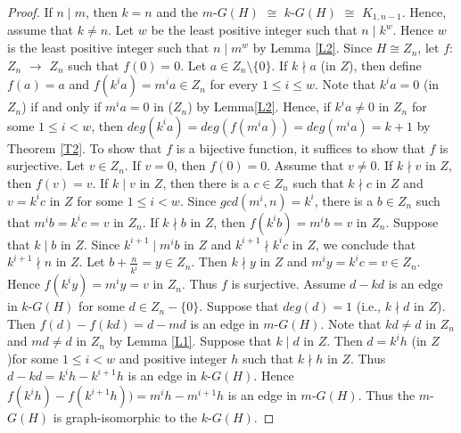 \documentclass{amsart}
\theoremstyle{plain}
\begin{document}
\begin{proof}
If $n \mid m$, then $k = n$ and the $m$-$G(H)$ $\cong$ $k$-$G(H)$ $\cong$ $K_{1, n-1}$.  Hence, assume that $k \not = n$. Let $w$ be the least positive integer such that $n \mid k^w$. Hence $w$ is the least positive integer such that $n \mid m^w$ by Lemma \ref{L2}. Since $H \cong Z_n$, let $f$: $Z_n$  $\rightarrow$ $Z_n$ such that $f(0) = 0$. Let $a \in Z_n \setminus \{0\}$. If $k\nmid a$ (in $Z$), then define $f(a) = a$ and $f(k^ia) = m^ia \in Z_n$ for every $1\leq i \leq w$. Note that $k^ia = 0$ (in $Z_n$) if and only if $m^ia = 0$ in ($Z_n$) by Lemma\ref{L2}. Hence, if $k^ia \not = 0$ in $Z_n$ for some $1 \leq i < w$, then  $deg(k^ia) = deg(f(m^ia)) = deg(m^ia) = k+1$ by Theorem \ref{T2}.  To show that $f$ is a bijective function, it suffices to show that $f$ is surjective. Let $v \in Z_n$. If $v = 0$, then $f(0) = 0$. Assume that $v \not = 0$. If $k\nmid v$ in $Z$, then $f(v) = v$.  If  $k\mid v$ in $Z$, then there is a $c \in Z_n$ such that $k\nmid c$ in $Z$ and $v = k^ic$ in $Z$ for some $1 \leq i < w$. Since $gcd (m^i, n) = k^i$, there is a $b \in Z_n$ such that $m^ib = k^ic= v$ in $Z_n$. If $k\nmid b$ in $Z$, then $f(k^ib) = m^ib = v$ in $Z_n$. Suppose that $k \mid b$ in $Z$. Since $k^{i+1} \mid m^ib$ in $Z$ and $k^{i+1} \nmid k^ic$ in $Z$,  we conclude that $k^{i+1} \nmid n$ in $Z$. Let $b + \frac{n}{k^i} = y\in Z_n$. Then $k \nmid y$ in $Z$ and $m^iy = k^ic = v \in Z_n$. Hence $f(k^iy) = m^iy = v$ in $Z_n$. Thus $f$ is surjective. Assume $d-kd$ is an edge in $k$-$G(H)$ for some $d \in Z_n - \{0\}$. Suppose that $deg(d) = 1$ (i.e., $k\nmid d$ in $Z$). Then $f(d)-f(kd) = d-md$ is an edge in $m$-$G(H)$.  Note that $kd \not = d$ in $Z_n$ and $md \not = d$ in $Z_n$ by Lemma \ref{L1}. Suppose that $k \mid d$ in $Z$. Then $d = k^ih$ (in $Z$)for some $1 \leq i <w$  and positive integer $h$ such that $k \nmid h$ in $Z$. Thus $d-kd = k^ih-k^{i + 1}h$ is an edge in $k$-$G(H)$. Hence $f(k^ih)-f(k^{i + 1}h)) = m^ih-m^{i+1}h$ is an edge in $m$-$G(H)$. Thus the $m$-$G(H)$ is graph-isomorphic to the $k$-$G(H)$.

	
\end{proof}
\end{document}
